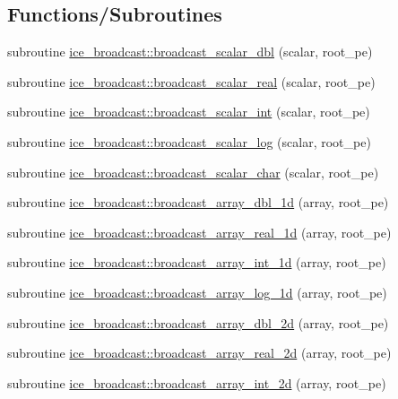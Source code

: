 \subsection*{Functions/Subroutines}
\begin{DoxyCompactItemize}
\item 
subroutine \hyperlink{namespaceice__broadcast_ac16c527490aae65b0e6e231479f259e5}{ice\_\-broadcast::broadcast\_\-scalar\_\-dbl} (scalar, root\_\-pe)
\item 
subroutine \hyperlink{namespaceice__broadcast_a8b0dd76d223d7f8a6d4df7e90a347877}{ice\_\-broadcast::broadcast\_\-scalar\_\-real} (scalar, root\_\-pe)
\item 
subroutine \hyperlink{namespaceice__broadcast_a690996befa457dac88bf595ebc00c927}{ice\_\-broadcast::broadcast\_\-scalar\_\-int} (scalar, root\_\-pe)
\item 
subroutine \hyperlink{namespaceice__broadcast_ac3acffb99e12d5eb798f33eb05ad47ce}{ice\_\-broadcast::broadcast\_\-scalar\_\-log} (scalar, root\_\-pe)
\item 
subroutine \hyperlink{namespaceice__broadcast_a3adeb2c1c8890bb5af4f4c57a6c969c3}{ice\_\-broadcast::broadcast\_\-scalar\_\-char} (scalar, root\_\-pe)
\item 
subroutine \hyperlink{namespaceice__broadcast_a662e8645225841aedf367a75226b54e6}{ice\_\-broadcast::broadcast\_\-array\_\-dbl\_\-1d} (array, root\_\-pe)
\item 
subroutine \hyperlink{namespaceice__broadcast_a8d3b349a33e8f578462da5b5506c2b21}{ice\_\-broadcast::broadcast\_\-array\_\-real\_\-1d} (array, root\_\-pe)
\item 
subroutine \hyperlink{namespaceice__broadcast_a8e560ce5af3aaac47d995fef6d8227f5}{ice\_\-broadcast::broadcast\_\-array\_\-int\_\-1d} (array, root\_\-pe)
\item 
subroutine \hyperlink{namespaceice__broadcast_a74b3384660f377db70f24bfc4ef599d8}{ice\_\-broadcast::broadcast\_\-array\_\-log\_\-1d} (array, root\_\-pe)
\item 
subroutine \hyperlink{namespaceice__broadcast_a52007fa2d05a9a9202b79ae38da8dfc8}{ice\_\-broadcast::broadcast\_\-array\_\-dbl\_\-2d} (array, root\_\-pe)
\item 
subroutine \hyperlink{namespaceice__broadcast_a831b40f3a8d5b4ed01be2eca8a3b4cc7}{ice\_\-broadcast::broadcast\_\-array\_\-real\_\-2d} (array, root\_\-pe)
\item 
subroutine \hyperlink{namespaceice__broadcast_a9b33c193842a02dc83a74c98cafd4dd0}{ice\_\-broadcast::broadcast\_\-array\_\-int\_\-2d} (array, root\_\-pe)

\end{DoxyCompactItemize}
